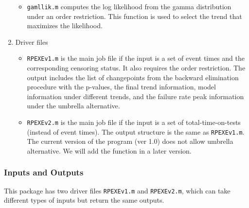 \documentclass[12pt] {article}
\begin{document}
\begin{enumerate}
\begin{itemize}
\item {\tt gamllik.m} computes the log likelihood from the gamma distribution under
    an order restriction. This function is used to select the trend that maximizes the likelihood.
\end{itemize}

\item Driver files
\begin{itemize}
\item {\tt RPEXEv1.m} is the main job file if the input is a set of event times and the corresponding censoring status. It also requires the order restriction. The output includes the list of changepoints from the backward elimination procedure with the p-values, the final trend information, model information under different trends, and the failure rate peak information under the umbrella alternative.

\item {\tt RPEXEv2.m} is the main job file if the input is a set of total-time-on-tests (instead of event times). The output structure is the same as {\tt RPEXEv1.m}. The current version of the program (ver 1.0) does not allow umbrella alternative. We will add the function in a later version.
\end{itemize}

\end{enumerate}

\subsubsection{Inputs and Outputs}

This package has two driver files {\tt RPEXEv1.m} and
{\tt RPEXEv2.m}, which can take different types of
inputs but return the same outputs.
\end{document}
